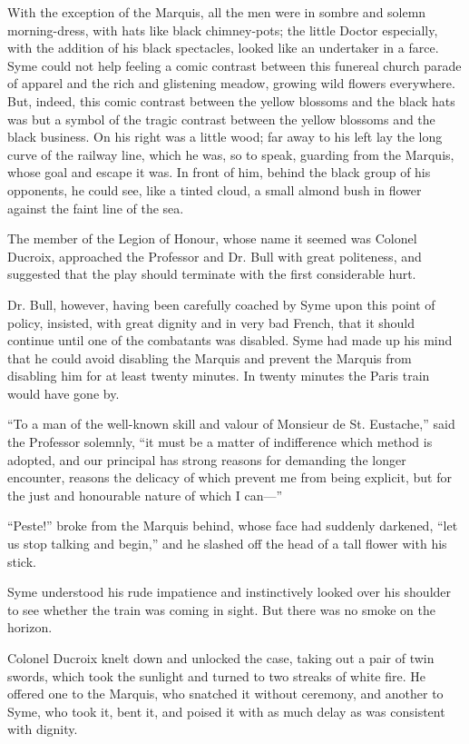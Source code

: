 With the exception of the Marquis, all the men were in sombre and solemn morning-dress, with hats like black chimney-pots; the little Doctor especially, with the addition of his black spectacles, looked like an undertaker in a farce. Syme could not help feeling a comic contrast between this funereal church parade of apparel and the rich and glistening meadow, growing wild flowers everywhere. But, indeed, this comic contrast between the yellow blossoms and the black hats was but a symbol of the tragic contrast between the yellow blossoms and the black business. On his right was a little wood; far away to his left lay the long curve of the railway line, which he was, so to speak, guarding from the Marquis, whose goal and escape it was. In front of him, behind the black group of his opponents, he could see, like a tinted cloud, a small almond bush in flower against the faint line of the sea.

The member of the Legion of Honour, whose name it seemed was Colonel Ducroix, approached the Professor and Dr. Bull with great politeness, and suggested that the play should terminate with the first considerable hurt.

Dr. Bull, however, having been carefully coached by Syme upon this point of policy, insisted, with great dignity and in very bad French, that it should continue until one of the combatants was disabled. Syme had made up his mind that he could avoid disabling the Marquis and prevent the Marquis from disabling him for at least twenty minutes. In twenty minutes the Paris train would have gone by.

“To a man of the well-known skill and valour of Monsieur de St. Eustache,” said the Professor solemnly, “it must be a matter of indifference which method is adopted, and our principal has strong reasons for demanding the longer encounter, reasons the delicacy of which prevent me from being explicit, but for the just and honourable nature of which I can⁠—”

“Peste!” broke from the Marquis behind, whose face had suddenly darkened, “let us stop talking and begin,” and he slashed off the head of a tall flower with his stick.

Syme understood his rude impatience and instinctively looked over his shoulder to see whether the train was coming in sight. But there was no smoke on the horizon.

Colonel Ducroix knelt down and unlocked the case, taking out a pair of twin swords, which took the sunlight and turned to two streaks of white fire. He offered one to the Marquis, who snatched it without ceremony, and another to Syme, who took it, bent it, and poised it with as much delay as was consistent with dignity.

